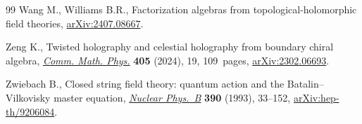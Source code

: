 \documentclass[10pt,a4paper]{amsart}
\numberwithin{equation}{section}
\theoremstyle{definition}
\begin{document}
\begin{thebibliography}{99}
Wang M., Williams B.R., Factorization algebras from topological-holomorphic
 field theories, \href{http://arxiv.org/abs/2407.08667}{arXiv:2407.08667}.

Zeng K., Twisted holography and celestial holography from boundary chiral
 algebra, \href{https://doi.org/10.1007/s00220-023-04917-0}{\textit{Comm.
 Math. Phys.}} \textbf{405} (2024), 19, 109~pages,
 \href{http://arxiv.org/abs/2302.06693}{arXiv:2302.06693}.

Zwiebach B., Closed string field theory: quantum action and the
 {B}atalin--{V}ilkovisky master equation,
 \href{https://doi.org/10.1016/0550-3213(93)90388-6}{\textit{Nuclear Phys.~B}}
 \textbf{390} (1993), 33--152,
 \href{http://arxiv.org/abs/hep-th/9206084}{arXiv:hep-th/9206084}.

\end{thebibliography}
\end{document}
